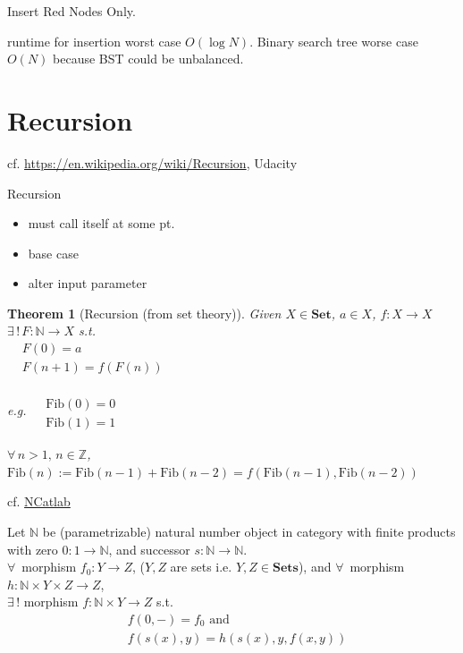 \documentclass[10pt]{amsart}
\newtheorem{theorem}{Theorem}
\begin{document}
\begin{multicols*}{2}
Insert Red Nodes Only. 

runtime for insertion worst case $O(\log{N})$. Binary search tree worse case $O(N)$ because BST could be unbalanced. 


\section{Recursion}

cf. \url{https://en.wikipedia.org/wiki/Recursion},  Udacity 

Recursion
\begin{itemize}
	\item must call itself at some pt.
	\item base case
	\item alter input parameter
\end{itemize}

\begin{theorem}[Recursion (from set theory)]
Given $X \in \textbf{Set}$, $a\in X$, $f:X \to X$ \\
$\exists \, ! \, F: \mathbb{N} \to X$ s.t. \\
$\begin{aligned}
& F(0) = a \\
& F(n+1) = f(F(n))
\end{aligned}$

e.g. $\begin{aligned} & \quad \\ 
	& \text{Fib}(0) = 0  \\
	& \text{Fib}(1) = 1 \end{aligned}$ 
	
	$\forall \, n > 1, \, n \in \mathbb{Z}$, $\text{Fib}(n) := \text{Fib}(n-1) + \text{Fib}(n-2) = f(\text{Fib}(n-1), \text{Fib}(n-2))$
\end{theorem} 

cf. \href{https://ncatlab.org/nlab/show/recursion}{NCatlab}

Let $\mathbb{N}$ be (parametrizable) natural number object in category with finite products with zero $0 : 1 \to \mathbb{N}$, and successor $s: \mathbb{N} \to \mathbb{N}$. \\
$\forall \, $ morphism $f_0 : Y \to Z$, ($Y, Z$ are sets i.e. $Y,Z \in \textbf{Sets}$), and $\forall \, $ morphism $h: \mathbb{N} \times Y \times Z \to Z$, \\
$\exists \, !$ morphism $f: \mathbb{N} \times Y \to Z$ s.t.
\begin{equation}
\begin{aligned} 
& f(0, -) = f_0 \text{ and } \\
& f(s(x), y) = h(s(x), y, f(x,y))
\end{aligned}
\end{equation}


\end{multicols*}
\end{document}
